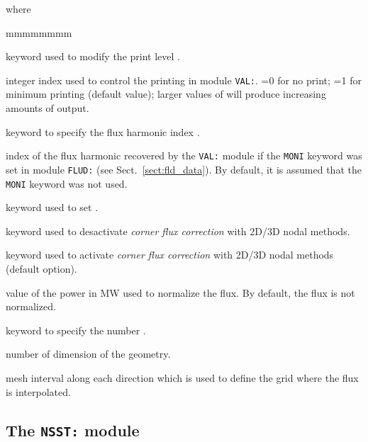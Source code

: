 \noindent where

\begin{ListeDeDescription}{mmmmmmmm}

\item[\moc{EDIT}] keyword used to modify the print level .

\item[\dusa{iprint}] integer index used to control  the printing in module {\tt VAL:}.
=0 for no print; =1 for minimum printing (default value); larger values of 
will produce increasing amounts of output.

\item[\moc{MODE}] keyword to specify the flux harmonic index .

\item[\dusa{imode}] index of the flux harmonic recovered by the {\tt VAL:} module if the {\tt MONI} keyword was set in module {\tt FLUD:}
(see Sect.~\ref{sect:fld_data}). By default, it is assumed that the {\tt MONI} keyword was not used.

\item[\moc{POWR}] keyword used to set .

\item[\moc{NOCCOR}] keyword used to desactivate {\sl corner flux correction} with 2D/3D nodal methods.

\item[\moc{CCOR}] keyword used to activate {\sl corner flux correction} with 2D/3D nodal methods (default option).

\item[\dusa{power}] value of the power in MW used to normalize the flux. By default, the flux is not normalized.

\item[\moc{DIM}] keyword to specify the number .

\item[\dusa{dim}] number of dimension of the geometry. 

\item[\dusa{dxyz}] mesh interval along each direction which is used to define the grid where the flux is interpolated. 

\end{ListeDeDescription}

\clearpage

\subsection{The {\tt NSST:} module}\label{sect:nsst}

